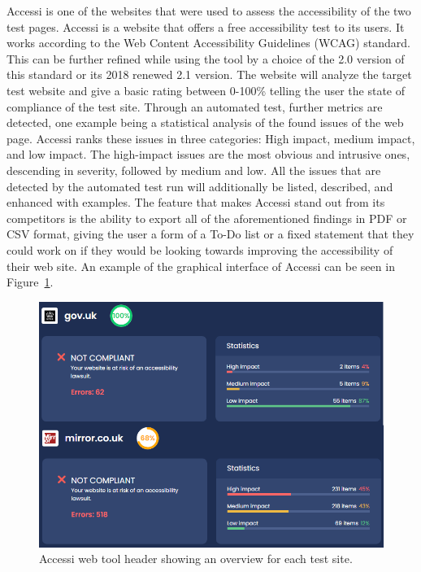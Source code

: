 Accessi \parencite{Accessi} is one of the websites that were used to
assess the accessibility of the two test pages. Accessi is a website
that offers a free accessibility test to its users. It works according
to the Web Content Accessibility Guidelines (WCAG) standard. This can
be further refined while using the tool by a choice of the 2.0 version
of this standard or its 2018 renewed 2.1 version.  The website will
analyze the target test website and give a basic rating between
0-100\% telling the user the state of compliance of the test
site. Through an automated test, further metrics are detected, one
example being a statistical analysis of the found issues of the web
page. Accessi ranks these issues in three categories: High impact,
medium impact, and low impact. The high-impact issues are the most
obvious and intrusive ones, descending in severity, followed by medium
and low. All the issues that are detected by the automated test run
will additionally be listed, described, and enhanced with
examples. The feature that makes Accessi stand out from its
competitors is the ability to export all of the aforementioned
findings in PDF or CSV format, giving the user a form of a To-Do list
or a fixed statement that they could work on if they would be looking
towards improving the accessibility of their web site. An example of
the graphical interface of Accessi can be seen in
Figure~\ref{fig:accessi}.



\begin{figure}[tp]
\centering
\includegraphics[keepaspectratio,width=\linewidth,height=\halfh]
{images/accessi.png}

\caption[Accessi Overview]
{%
Accessi web tool header showing an overview for each test site.
}
\label{fig:accessi}
\end{figure}





